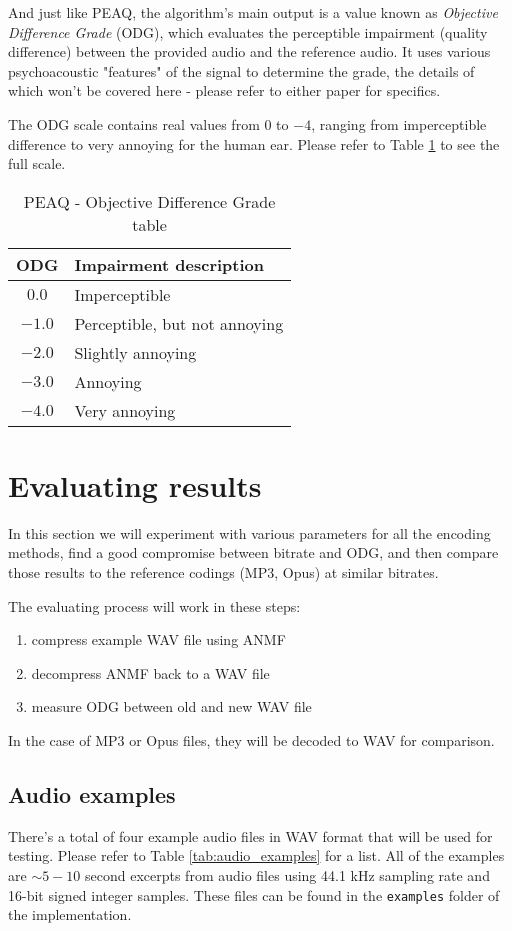 And just like PEAQ, the algorithm's main output is a value known as \emph{Objective Difference Grade} (ODG), which evaluates the perceptible impairment (quality difference) between the provided audio and the reference audio. It uses various psychoacoustic "features" of the signal to determine the grade, the details of which won't be covered here - please refer to either paper for specifics.

The ODG scale contains real values from $0$ to $-4$, ranging from imperceptible difference to very annoying for the human ear. Please refer to Table \ref{tab:odg_scale} to see the full scale.

\begin{table}[htbp]\caption{PEAQ - Objective Difference Grade table}
	\label{tab:odg_scale}
	\centering
	\begin{tabular}{|c|l|}
		\hline
		ODG & Impairment description \\ \hline
		$0.0$ & Imperceptible \\
		$-1.0$ & Perceptible, but not annoying \\
		$-2.0$ & Slightly annoying \\
		$-3.0$ & Annoying \\
		$-4.0$ & Very annoying \\
		\hline
	\end{tabular}
\end{table}

\section{Evaluating results}
In this section we will experiment with various parameters for all the encoding methods, find a good compromise between bitrate and ODG, and then compare those results to the reference codings (MP3, Opus) at similar bitrates.

The evaluating process will work in these steps:

\begin{enumerate}
	\item compress example WAV file using ANMF
	\item decompress ANMF back to a WAV file
	\item measure ODG between old and new WAV file
\end{enumerate}

In the case of MP3 or Opus files, they will be decoded to WAV for comparison.

\subsection{Audio examples}
There's a total of four example audio files in WAV format that will be used for testing. Please refer to Table \ref{tab:audio_examples} for a list. All of the examples are $\sim5-10$ second excerpts from audio files using 44.1 kHz sampling rate and 16-bit signed integer samples. These files can be found in the \verb|examples| folder of the implementation.

